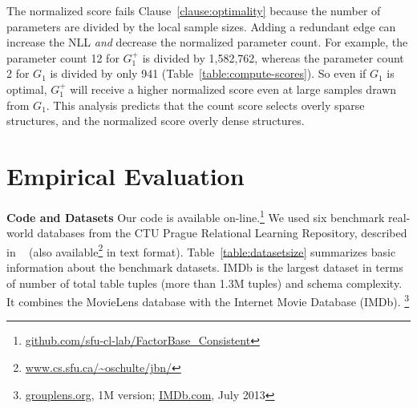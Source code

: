 \documentclass{article}
\begin{document}
The normalized score fails Clause~\ref{clause:optimality} because the number of parameters are divided by the local sample sizes. Adding a redundant edge can increase the NLL {\em and} decrease the normalized parameter count. For example, the  parameter count 12 for $G_{1}^{+}$ is divided by 1,582,762, whereas the parameter count 2 for $G_{1}$ is divided by only 941 (Table~\ref{table:compute-scores}). So even if $G_{1}$ is optimal, $G_{1}^{+}$ will receive a higher normalized score even at large samples drawn from $G_{1}$.
This analysis predicts that the count score selects overly sparse structures, and the normalized score overly dense structures.


\section{Empirical Evaluation} 


\textbf{Code and Datasets} Our code is available on-line.\footnote{ \url{github.com/sfu-cl-lab/FactorBase_Consistent}}
We used six benchmark real-world databases from the CTU Prague Relational Learning Repository, described in ~\cite{Motl2015a} (also available\footnote{\url{www.cs.sfu.ca/~oschulte/jbn/}} in text format). %
Table~\ref{table:datasetsize} summarizes basic information about the benchmark datasets.   IMDb is the largest dataset in terms of number of total table tuples (more than 1.3M tuples) and schema complexity. %
It combines the MovieLens database %
with the Internet Movie Database (IMDb).
\footnote{\url{grouplens.org}, 1M version; 
\url{IMDb.com}, July 2013}


\end{document}
